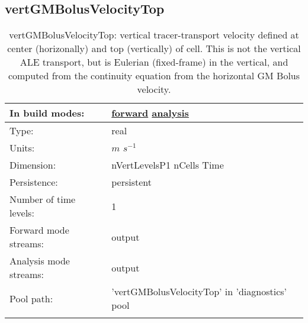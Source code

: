 \subsection[vertGMBolusVelocityTop]{vertGMBolusVelocityTop}
\label{subsec:var_sec_diagnostics_vertGMBolusVelocityTop}
\begin{center}
\begin{longtable}{| p{2.0in} | p{4.0in} |}
        \hline 
        In build modes: & \hyperref[subsec:forward_var_tab_diagnostics]{forward} \hyperref[subsec:analysis_var_tab_diagnostics]{analysis} \\
        \hline 
        Type: & real \\
        \hline 
        Units: & $m$ $s^{-1}$ \\
        \hline 
        Dimension: & nVertLevelsP1 nCells Time \\
        \hline 
        Persistence: & persistent \\
        \hline 
        Number of time levels: & 1 \\
        \hline 
		 Forward mode streams: &  output \\
        \hline 
		 Analysis mode streams: &  output \\
        \hline 
            Pool path: & 'vertGMBolusVelocityTop' in 'diagnostics' pool
 \\
		 \hline 
    \caption{vertGMBolusVelocityTop: vertical tracer-transport velocity defined at center (horizonally) and top (vertically) of cell.  This is not the vertical ALE transport, but is Eulerian (fixed-frame) in the vertical, and computed from the continuity equation from the horizontal GM Bolus velocity.}
\end{longtable}
\end{center}
